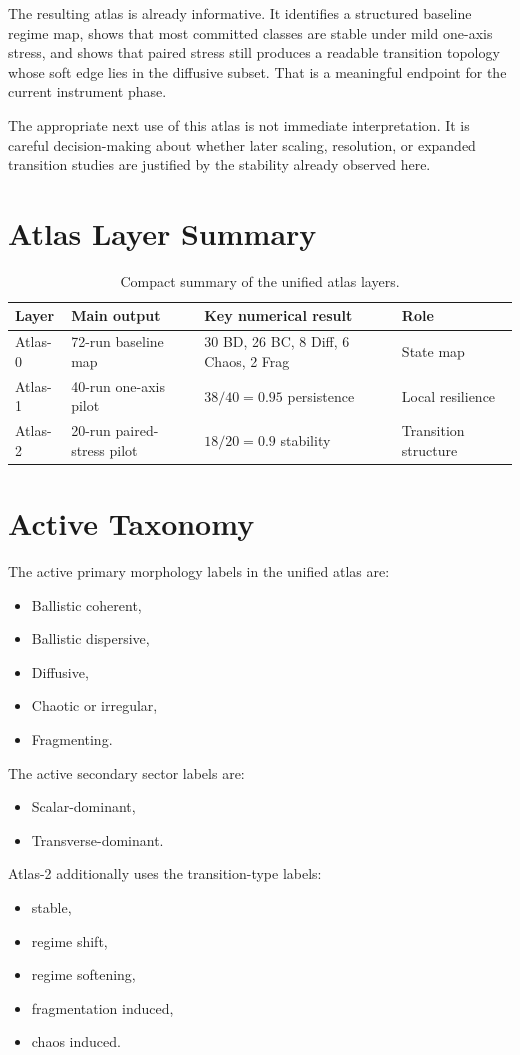 \documentclass[11pt]{article}
\begin{document}
The resulting atlas is already informative. It identifies a structured baseline regime map, shows that most committed classes are stable under mild one-axis stress, and shows that paired stress still produces a readable transition topology whose soft edge lies in the diffusive subset. That is a meaningful endpoint for the current instrument phase.

The appropriate next use of this atlas is not immediate interpretation. It is careful decision-making about whether later scaling, resolution, or expanded transition studies are justified by the stability already observed here.

\appendix

\section{Atlas Layer Summary}
\begin{table}[h]
\centering
\begin{tabular}{p{}p{}p{}p{}}
\hline
Layer & Main output & Key numerical result & Role \\
\hline
Atlas-0 & 72-run baseline map & 30 BD, 26 BC, 8 Diff, 6 Chaos, 2 Frag & State map \\
Atlas-1 & 40-run one-axis pilot & $38/40 = 0.95$ persistence & Local resilience \\
Atlas-2 & 20-run paired-stress pilot & $18/20 = 0.9$ stability & Transition structure \\
\hline
\end{tabular}
\caption{Compact summary of the unified atlas layers.}
\end{table}

\section{Active Taxonomy}
The active primary morphology labels in the unified atlas are:
\begin{itemize}
\item Ballistic coherent,
\item Ballistic dispersive,
\item Diffusive,
\item Chaotic or irregular,
\item Fragmenting.
\end{itemize}
The active secondary sector labels are:
\begin{itemize}
\item Scalar-dominant,
\item Transverse-dominant.
\end{itemize}
Atlas-2 additionally uses the transition-type labels:
\begin{itemize}
\item stable,
\item regime shift,
\item regime softening,
\item fragmentation induced,
\item chaos induced.
\end{itemize}
\end{document}
